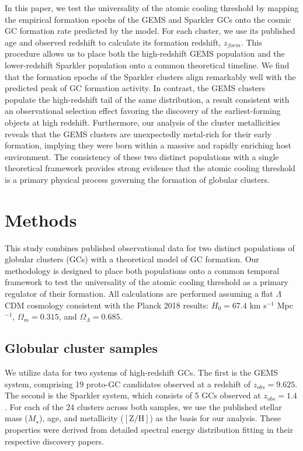 \documentclass[]{article}
\begin{document}
In this paper, we test the universality of the atomic cooling threshold by mapping the empirical formation epochs of the GEMS and Sparkler GCs onto the cosmic GC formation rate predicted by the model. For each cluster, we use its published age and observed redshift to calculate its formation redshift, $z_{form}$. This procedure allows us to place both the high-redshift GEMS population and the lower-redshift Sparkler population onto a common theoretical timeline. We find that the formation epochs of the Sparkler clusters align remarkably well with the predicted peak of GC formation activity. In contrast, the GEMS clusters populate the high-redshift tail of the same distribution, a result consistent with an observational selection effect favoring the discovery of the earliest-forming objects at high redshift. Furthermore, our analysis of the cluster metallicities reveals that the GEMS clusters are unexpectedly metal-rich for their early formation, implying they were born within a massive and rapidly enriching host environment. The consistency of these two distinct populations with a single theoretical framework provides strong evidence that the atomic cooling threshold is a primary physical process governing the formation of globular clusters.

\section{Methods}
\label{sec:methods}
This study combines published observational data for two distinct populations of globular clusters (GCs) with a theoretical model of GC formation. Our methodology is designed to place both populations onto a common temporal framework to test the universality of the atomic cooling threshold as a primary regulator of their formation. All calculations are performed assuming a flat $\Lambda$CDM cosmology consistent with the Planck 2018 results: $H_0 = 67.4$ km s$^{-1}$ Mpc$^{-1}$, $\Omega_m = 0.315$, and $\Omega_\Lambda = 0.685$.

\subsection{Globular cluster samples}
We utilize data for two systems of high-redshift GCs. The first is the GEMS system, comprising 19 proto-GC candidates observed at a redshift of $z_{obs} = 9.625$. The second is the Sparkler system, which consists of 5 GCs observed at $z_{obs} = 1.4$. For each of the 24 clusters across both samples, we use the published stellar mass ($M_\star$), age, and metallicity ($[\mathrm{Z/H}]$) as the basis for our analysis. These properties were derived from detailed spectral energy distribution fitting in their respective discovery papers.
\end{document}
